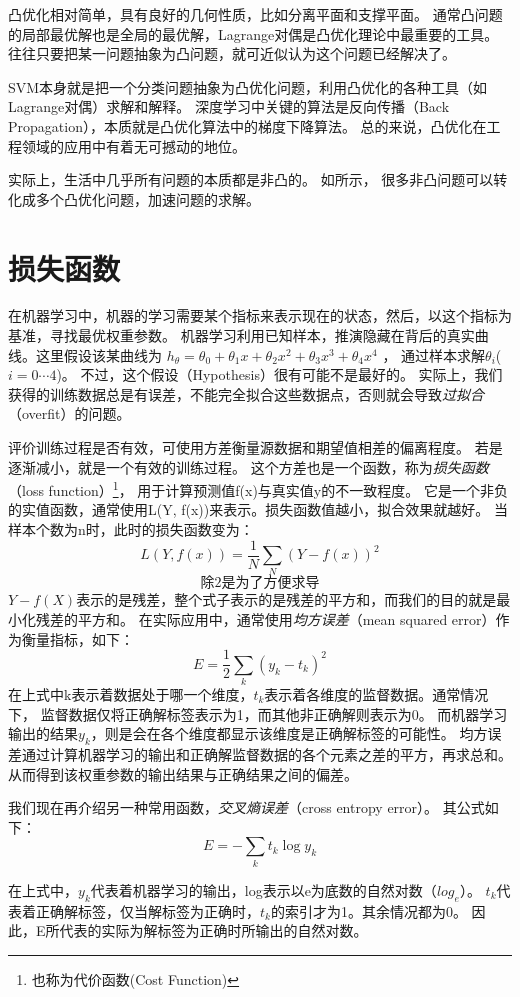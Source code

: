 凸优化相对简单，具有良好的几何性质，比如分离平面和支撑平面。
通常凸问题的局部最优解也是全局的最优解，Lagrange对偶是凸优化理论中最重要的工具。
往往只要把某一问题抽象为凸问题，就可近似认为这个问题已经解决了。

SVM本身就是把一个分类问题抽象为凸优化问题，利用凸优化的各种工具（如Lagrange对偶）求解和解释。
深度学习中关键的算法是反向传播（Back Propagation），本质就是凸优化算法中的梯度下降算法。
总的来说，凸优化在工程领域的应用中有着无可撼动的地位。

实际上，生活中几乎所有问题的本质都是非凸的。
如所示，
很多非凸问题可以转化成多个凸优化问题，加速问题的求解。

\section{损失函数}
在机器学习中，机器的学习需要某个指标来表示现在的状态，然后，以这个指标为基准，寻找最优权重参数。
机器学习利用已知样本，推演隐藏在背后的真实曲线。这里假设该某曲线为
$h_{\theta}=\theta_0+\theta_1x+\theta_2x^2+\theta_3x^3+\theta_4x^4$ ，
通过样本求解$\theta_i$($i=0\cdots4$)。
不过，这个假设（Hypothesis）很有可能不是最好的。
实际上，我们获得的训练数据总是有误差，不能完全拟合这些数据点，否则就会导致\emph{过拟合}（overfit）的问题。

评价训练过程是否有效，可使用方差衡量源数据和期望值相差的偏离程度。
若是逐渐减小，就是一个有效的训练过程。
这个方差也是一个函数，称为\emph{损失函数}（loss function）\footnote{也称为代价函数(Cost Function)}，
用于计算预测值f(x)与真实值y的不一致程度。
它是一个非负的实值函数，通常使用L(Y, f(x))来表示。损失函数值越小，拟合效果就越好。
当样本个数为n时，此时的损失函数变为：
$$
L(Y, f(x)) = \frac{1}{N}\sum\limits_{N}(Y-f(x))^2
$$
$$\text{除2是为了方便求导}$$
$Y-f(X)$表示的是残差，整个式子表示的是残差的平方和，而我们的目的就是最小化残差的平方和。
在实际应用中，通常使用\emph{均方误差}（mean squared error）作为衡量指标，如下：
$$
E=\frac{1}{2} \sum_{k}\left(y_{k}-t_{k}\right)^{2}
$$
在上式中k表示着数据处于哪一个维度，$t_{k}$表示着各维度的监督数据。通常情况下，
监督数据仅将正确解标签表示为1，而其他非正确解则表示为0。
而机器学习输出的结果$y_{k}$，则是会在各个维度都显示该维度是正确解标签的可能性。
均方误差通过计算机器学习的输出和正确解监督数据的各个元素之差的平方，再求总和。
从而得到该权重参数的输出结果与正确结果之间的偏差。

我们现在再介绍另一种常用函数，\emph{交叉熵误差}（cross entropy error）。
其公式如下：
$$
E=-\sum_{k} t_{k} \log y_{k}
$$

在上式中，$y_{k}$代表着机器学习的输出，log表示以e为底数的自然对数（$log_{e}$）。
$t_{k}$代表着正确解标签，仅当解标签为正确时，$t_{k}$的索引才为1。其余情况都为0。
因此，E所代表的实际为解标签为正确时所输出的自然对数。


